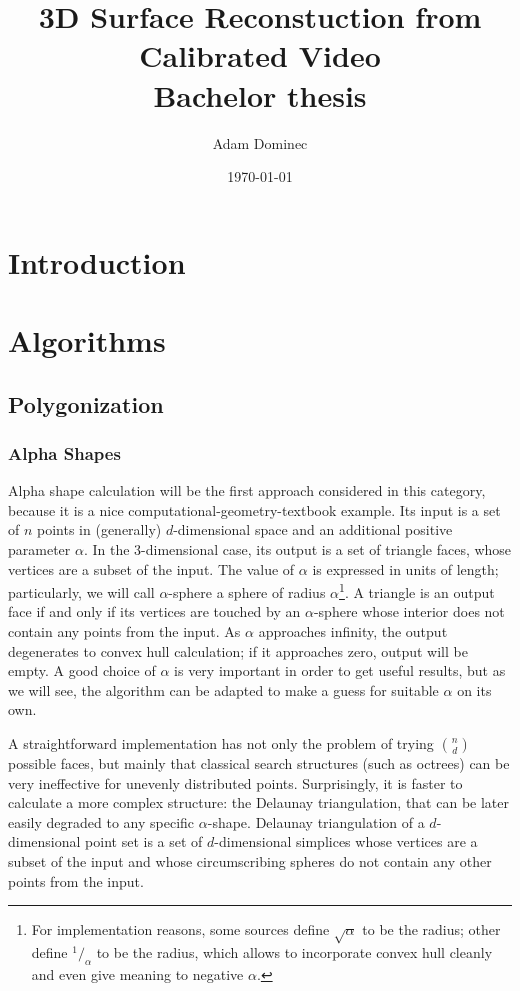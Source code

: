 \documentclass[12pt]{article}
\begin{document}
\title{3D Surface Reconstuction from Calibrated Video\\
Bachelor thesis}
\author{Adam Dominec}
\date{\today}
\maketitle
\section{Introduction}
\section{Algorithms}
\subsection{Polygonization}
\subsubsection{Alpha Shapes}
Alpha shape calculation will be the first approach considered in this category, because it is a nice computational-geometry-textbook example. Its input is a set of $n$ points in (generally) $d$-dimensional space and an additional positive parameter $\alpha$. In the $3$-dimensional case, its output is a set of triangle faces, whose vertices are a subset of the input. The value of $\alpha$ is expressed in units of length; particularly, we will call $\alpha$-sphere a sphere of radius $\alpha$\footnote{For implementation reasons, some sources define $\sqrt{\alpha}$ to be the radius; other define ${}^1\!/_\alpha$ to be the radius, which allows to incorporate convex hull cleanly and even give meaning to negative $\alpha$.}. A triangle is an output face if and only if its vertices are touched by an $\alpha$-sphere whose interior does not contain any points from the input. As $\alpha$ approaches infinity, the output degenerates to convex hull calculation; if it approaches zero, output will be empty. A good choice of $\alpha$ is very important in order to get useful results, but as we will see, the algorithm can be adapted to make a guess for suitable $\alpha$ on its own.

A straightforward implementation has not only the problem of trying $\binom n d$ possible faces, but mainly that classical search structures (such as octrees) can be very ineffective for unevenly distributed points. Surprisingly, it is faster to calculate a more complex structure: the Delaunay triangulation, that can be later easily degraded to any specific $\alpha$-shape. Delaunay triangulation of a $d$-dimensional point set is a set of $d$-dimensional simplices whose vertices are a subset of the input and whose circumscribing spheres do not contain any other points from the input.
\end{document}
